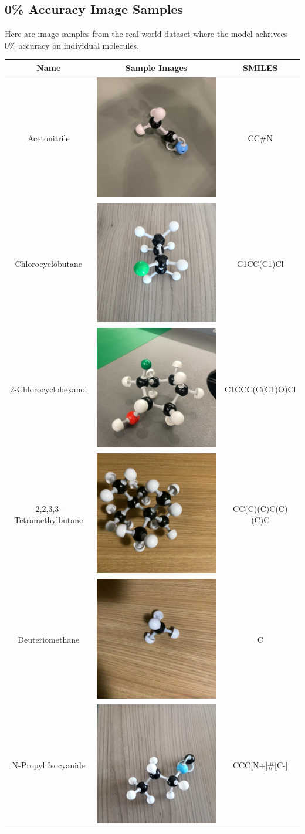 \documentclass[12pt]{article}
\begin{document}
\subsection*{0\% Accuracy Image Samples}
Here are image samples from the real-world dataset where the model achrivees 0\% accuracy on individual molecules. \\
\begin{center}
    \begin{tabular}{c|c|c}
        Name & Sample Images   & SMILES  \\ \hline
        Acetonitrile&  \includegraphics[width=0.15\linewidth]{6342.png} & CC\#N\\ \hline
        Chlorocyclobutane&  \includegraphics[width=0.15\linewidth]{70712.png} & C1CC(C1)Cl\\ \hline
        2-Chlorocyclohexanol&  \includegraphics[width=0.15\linewidth]{15274.png} & C1CCC(C(C1)O)Cl\\ \hline
        2,2,3,3-Tetramethylbutane&  \includegraphics[width=0.15\linewidth]{11675.png} & CC(C)(C)C(C)(C)C\\ \hline
        Deuteriomethane&  \includegraphics[width=0.15\linewidth]{12669.png} & C\\ \hline
        N-Propyl Isocyanide&  \includegraphics[width=0.15\linewidth]{79084.png} & CCC[N+]\#[C-]\\ \hline
\end{tabular}
\end{center}
\end{document}
